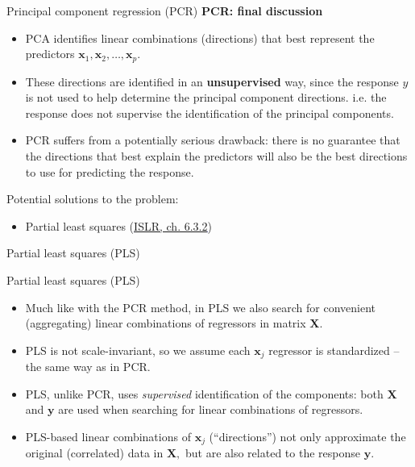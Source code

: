 \documentclass{beamer}
\begin{document}
\begin{frame}{Principal component regression (PCR)}
\textbf{PCR: final discussion}
\medskip
\begin{itemize}
\item PCA identifies linear combinations (directions) that best
represent the predictors $\bm{x}_1, \bm{x}_2, \dots , \bm{x}_p$.
\item These directions are identified in an \textbf{unsupervised} way, since the response $y$ is not used to help determine the principal component directions. i.e. the response does not supervise the identification of the principal components.
\item PCR suffers from a potentially serious drawback: there is no guarantee that the directions that best explain the predictors will also be the best directions to use for predicting the response.
\end{itemize}
\medskip
Potential solutions to the problem:
\begin{itemize}
\item Partial least squares (\textcolor{blue}{\underline{\href{http://www-bcf.usc.edu/~gareth/ISL/}{ISLR, ch. 6.3.2}}})
\end{itemize}
\end{frame}
\begin{frame}{Partial least squares (PLS)}
\end{frame}
\begin{frame}{Partial least squares (PLS)}
\begin{itemize}
\item Much like with the PCR method, in PLS we also search for convenient (aggregating) linear combinations of regressors in matrix $\bm{X}$.\\
\medskip
\item PLS is not scale-invariant, so we assume each $\bm{x}_j$ regressor is standardized -- the same way as in PCR.\\
\medskip
\item PLS, unlike PCR, uses \textit{supervised} identification of the components: both $\bm{X}$ and $\bm{y}$ are used when searching for linear combinations of regressors.\\
\medskip
\item PLS-based linear combinations of $\bm{x}_j$ (``directions'') not only approximate the original (correlated) data in $\bm{X},$ but are also related to the response $\bm{y}$.
\end{itemize}
\end{frame}
\end{document}
